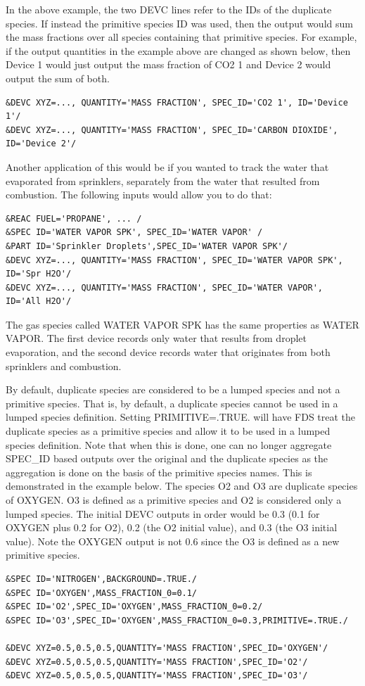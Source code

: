 \documentclass[11pt]{book}
\begin{document}
In the above example, the two {\ct DEVC} lines refer to the {\ct ID}s of the duplicate species.  If instead the primitive species {\ct ID} was used, then the output would sum the mass fractions over all species containing that primitive species.  For example, if the output quantities in the example above are changed as shown below, then {\ct Device 1} would just output the mass fraction of {\ct CO2 1} and {\ct Device 2} would output the sum of both.
\begin{lstlisting}
&DEVC XYZ=..., QUANTITY='MASS FRACTION', SPEC_ID='CO2 1', ID='Device 1'/
&DEVC XYZ=..., QUANTITY='MASS FRACTION', SPEC_ID='CARBON DIOXIDE', ID='Device 2'/
\end{lstlisting}
Another application of this would be if you wanted to track the water that evaporated from sprinklers, separately from the water
that resulted from combustion.  The following inputs would allow you to do that:
\begin{lstlisting}
&REAC FUEL='PROPANE', ... /
&SPEC ID='WATER VAPOR SPK', SPEC_ID='WATER VAPOR' /
&PART ID='Sprinkler Droplets',SPEC_ID='WATER VAPOR SPK'/
&DEVC XYZ=..., QUANTITY='MASS FRACTION', SPEC_ID='WATER VAPOR SPK', ID='Spr H2O'/
&DEVC XYZ=..., QUANTITY='MASS FRACTION', SPEC_ID='WATER VAPOR', ID='All H2O'/
\end{lstlisting}
The gas species called {\ct WATER VAPOR SPK} has the same properties as {\ct WATER VAPOR}. The first device records only water that results from droplet evaporation, and the second device records water that originates from both sprinklers and combustion.

By default, duplicate species are considered to be a lumped species and not a primitive species.  That is, by default, a duplicate species cannot be used in a lumped species definition.  Setting {\ct PRIMITIVE=.TRUE.} will have FDS treat the duplicate species as a primitive species and allow it to be used in a lumped species definition.  Note that when this is done, one can no longer aggregate {\ct SPEC\_ID} based outputs over the original and the duplicate species as the aggregation is done on the basis of the primitive species names.  This is demonstrated in the example below.  The species {\ct O2} and {\ct O3} are duplicate species of {\ct OXYGEN}.  {\ct O3} is defined as a primitive species and {\ct O2} is considered only a lumped species.  The initial {\ct DEVC} outputs in order would be 0.3 (0.1 for {\ct OXYGEN} plus 0.2 for {\ct O2}), 0.2 (the {\ct O2} initial value), and 0.3 (the {\ct O3} initial value).  Note the {\ct OXYGEN} output is not 0.6 since the {\ct O3} is defined as a new primitive species.
\begin{lstlisting}
&SPEC ID='NITROGEN',BACKGROUND=.TRUE./
&SPEC ID='OXYGEN',MASS_FRACTION_0=0.1/
&SPEC ID='O2',SPEC_ID='OXYGEN',MASS_FRACTION_0=0.2/
&SPEC ID='O3',SPEC_ID='OXYGEN',MASS_FRACTION_0=0.3,PRIMITIVE=.TRUE./

&DEVC XYZ=0.5,0.5,0.5,QUANTITY='MASS FRACTION',SPEC_ID='OXYGEN'/
&DEVC XYZ=0.5,0.5,0.5,QUANTITY='MASS FRACTION',SPEC_ID='O2'/
&DEVC XYZ=0.5,0.5,0.5,QUANTITY='MASS FRACTION',SPEC_ID='O3'/
\end{lstlisting}
\end{document}
